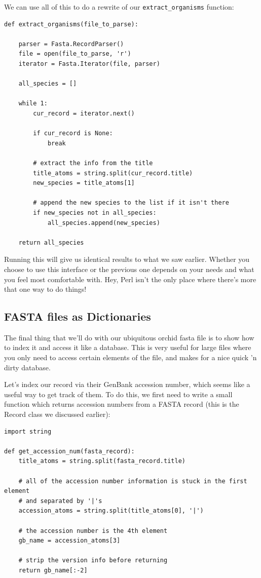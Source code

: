 \documentclass{report}
\begin{document}
We can use all of this to do a rewrite of our \verb|extract_organisms| function:

\begin{verbatim}
def extract_organisms(file_to_parse):

    parser = Fasta.RecordParser()
    file = open(file_to_parse, 'r')
    iterator = Fasta.Iterator(file, parser)

    all_species = []

    while 1:
        cur_record = iterator.next()

        if cur_record is None:
            break

        # extract the info from the title
        title_atoms = string.split(cur_record.title)
        new_species = title_atoms[1]

        # append the new species to the list if it isn't there
        if new_species not in all_species:
            all_species.append(new_species)

    return all_species
\end{verbatim}

Running this will give us identical results to what we saw earlier. Whether you choose to use this interface or the previous one depends on your needs and what you feel most comfortable with. Hey, Perl isn't the only place where there's more that one way to do things!

\subsection{FASTA files as Dictionaries}

The final thing that we'll do with our ubiquitous orchid fasta file is to show how to index it and access it like a database. This is very useful for large files where you only need to access certain elements of the file, and makes for a nice quick 'n dirty database.


Let's index our record via their GenBank accession number, which seems like a useful way to get track of them. To do this, we first need to write a small function which returns accession numbers from a FASTA record (this is the Record class we discussed earlier):

\begin{verbatim}
import string

def get_accession_num(fasta_record):
    title_atoms = string.split(fasta_record.title)

    # all of the accession number information is stuck in the first element
    # and separated by '|'s
    accession_atoms = string.split(title_atoms[0], '|')
 
    # the accession number is the 4th element
    gb_name = accession_atoms[3]

    # strip the version info before returning
    return gb_name[:-2]
\end{verbatim}
\end{document}
